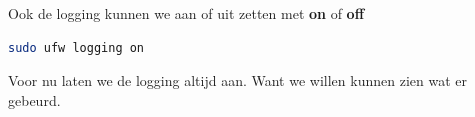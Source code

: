 Ook de logging kunnen we aan of uit zetten met \textbf{on} of \textbf{off}
\begin{lstlisting}[language=bash]
sudo ufw logging on
\end{lstlisting}
Voor nu laten we de logging altijd aan. Want we willen kunnen zien wat er gebeurd.

